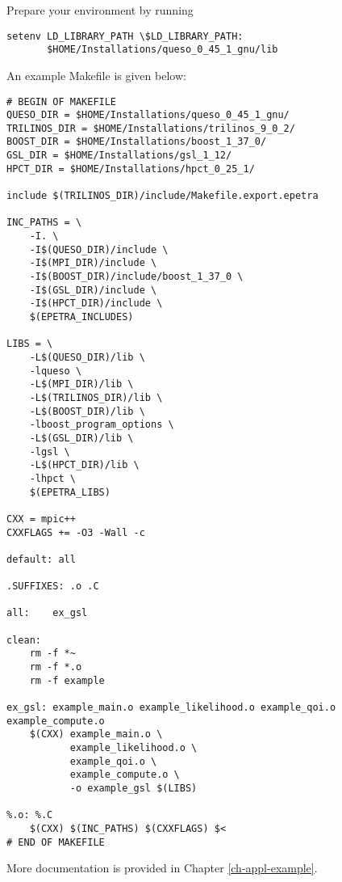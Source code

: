 Prepare your environment by running
\begin{verbatim}
setenv LD_LIBRARY_PATH \$LD_LIBRARY_PATH:
       $HOME/Installations/queso_0_45_1_gnu/lib
\end{verbatim}

An example Makefile is given below:
\begin{verbatim}
# BEGIN OF MAKEFILE
QUESO_DIR = $HOME/Installations/queso_0_45_1_gnu/
TRILINOS_DIR = $HOME/Installations/trilinos_9_0_2/
BOOST_DIR = $HOME/Installations/boost_1_37_0/
GSL_DIR = $HOME/Installations/gsl_1_12/
HPCT_DIR = $HOME/Installations/hpct_0_25_1/

include $(TRILINOS_DIR)/include/Makefile.export.epetra

INC_PATHS = \
	-I. \
	-I$(QUESO_DIR)/include \
	-I$(MPI_DIR)/include \
	-I$(BOOST_DIR)/include/boost_1_37_0 \
	-I$(GSL_DIR)/include \
	-I$(HPCT_DIR)/include \
	$(EPETRA_INCLUDES)

LIBS = \
	-L$(QUESO_DIR)/lib \
	-lqueso \
	-L$(MPI_DIR)/lib \
	-L$(TRILINOS_DIR)/lib \
	-L$(BOOST_DIR)/lib \
	-lboost_program_options \
	-L$(GSL_DIR)/lib \
	-lgsl \
	-L$(HPCT_DIR)/lib \
	-lhpct \
	$(EPETRA_LIBS)

CXX = mpic++
CXXFLAGS += -O3 -Wall -c

default: all

.SUFFIXES: .o .C

all:	ex_gsl

clean:
	rm -f *~
	rm -f *.o
	rm -f example

ex_gsl: example_main.o example_likelihood.o example_qoi.o example_compute.o
	$(CXX) example_main.o \
	       example_likelihood.o \
	       example_qoi.o \
	       example_compute.o \
	       -o example_gsl $(LIBS)

%.o: %.C
	$(CXX) $(INC_PATHS) $(CXXFLAGS) $<
# END OF MAKEFILE
\end{verbatim}

More documentation is provided in Chapter \ref{ch-appl-example}.
